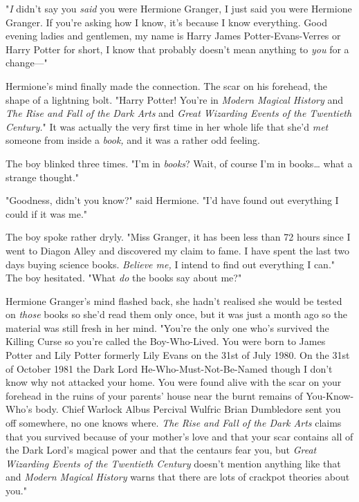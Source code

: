 "\emph{I} didn't say you \emph{said} you were Hermione Granger, I just said you 
were Hermione Granger. If you're asking how I know, it's because I know 
everything. Good evening ladies and gentlemen, my name is Harry James 
Potter-Evans-Verres or Harry Potter for short, I know that probably doesn't 
mean anything to \emph{you} for a change---"

Hermione's mind finally made the connection. The scar on his forehead, the 
shape of a lightning bolt. "Harry Potter! You're in \emph{Modern Magical 
History} and \emph{The Rise and Fall of the Dark Arts} and \emph{Great 
Wizarding Events of the Twentieth Century.}" It was actually the very first 
time in her whole life that she'd \emph{met} someone from inside a \emph{book,} 
and it was a rather odd feeling.

The boy blinked three times. "I'm in \emph{books}? Wait, of course I'm in 
books{\ldots} what a strange thought."

"Goodness, didn't you know?" said Hermione. "I'd have found out everything I 
could if it was me."

The boy spoke rather dryly. "Miss Granger, it has been less than 72 hours since 
I went to Diagon Alley and discovered my claim to fame. I have spent the last 
two days buying science books. \emph{Believe me,} I intend to find out 
everything I can." The boy hesitated. "What \emph{do} the books say about me?"

Hermione Granger's mind flashed back, she hadn't realised she would be tested 
on \emph{those} books so she'd read them only once, but it was just a month ago 
so the material was still fresh in her mind. "You're the only one who's 
survived the Killing Curse so you're called the Boy-Who-Lived. You were born to 
James Potter and Lily Potter formerly Lily Evans on the 31st of July 1980. On 
the 31st of October 1981 the Dark Lord He-Who-Must-Not-Be-Named though I don't 
know why not attacked your home. You were found alive with the scar on your 
forehead in the ruins of your parents' house near the burnt remains of 
You-Know-Who's body. Chief Warlock Albus Percival Wulfric Brian Dumbledore sent 
you off somewhere, no one knows where. \emph{The Rise and Fall of the Dark 
Arts} claims that you survived because of your mother's love and that your scar 
contains all of the Dark Lord's magical power and that the centaurs fear you, 
but \emph{Great Wizarding Events of the Twentieth Century} doesn't mention 
anything like that and \emph{Modern Magical History} warns that there are lots 
of crackpot theories about you."

